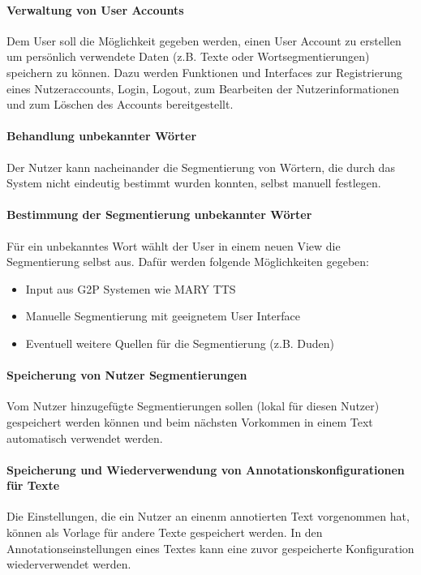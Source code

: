 \paragraph{Verwaltung von User Accounts}
Dem User soll die Möglichkeit gegeben werden, einen User Account zu erstellen um persönlich verwendete Daten (z.B. Texte oder Wortsegmentierungen) speichern zu können. Dazu werden Funktionen und Interfaces zur Registrierung eines Nutzeraccounts, Login, Logout, zum Bearbeiten der Nutzerinformationen und zum Löschen des Accounts bereitgestellt.

\paragraph{Behandlung unbekannter Wörter}
Der Nutzer kann nacheinander die Segmentierung von Wörtern, die durch das System nicht eindeutig bestimmt wurden konnten, selbst manuell festlegen.

\paragraph{Bestimmung der Segmentierung unbekannter Wörter}
Für ein unbekanntes Wort wählt der User in einem neuen View die Segmentierung selbst aus. Dafür werden folgende Möglichkeiten gegeben:
\begin{itemize}
	\item Input aus G2P Systemen wie MARY TTS
	\item Manuelle Segmentierung mit geeignetem User Interface
	\item Eventuell weitere Quellen für die Segmentierung (z.B. Duden)
\end{itemize}

\paragraph{Speicherung von Nutzer Segmentierungen}
Vom Nutzer hinzugefügte Segmentierungen sollen (lokal für diesen Nutzer) gespeichert werden können und beim nächsten Vorkommen in einem Text automatisch verwendet werden.

\paragraph{Speicherung und Wiederverwendung von Annotationskonfigurationen für Texte}
Die Einstellungen, die ein Nutzer an einenm annotierten Text vorgenommen hat, können als Vorlage für andere Texte gespeichert werden. In den Annotationseinstellungen eines Textes kann eine zuvor gespeicherte Konfiguration wiederverwendet werden.

